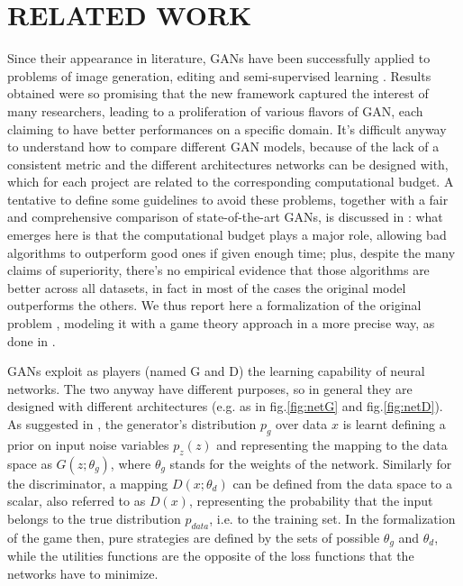 \section{RELATED WORK} \label{relatedwork}

Since their appearance in literature, GANs have been successfully applied to problems of image generation, editing and semi-supervised learning \cite{DBLP:journals/corr/RadfordMC15} \cite{DBLP:journals/corr/ZhangXLZHWM16}.
Results obtained were so promising that the new framework captured the interest of many researchers, leading to a proliferation of various flavors of GAN, each claiming to have better performances on a specific domain.
It's difficult anyway to understand how to compare different GAN models, because of the lack of a consistent metric and the different architectures networks can be designed with, which for each project are related to the corresponding computational budget.
A tentative to define some guidelines to avoid these problems, together with a fair and comprehensive comparison of state-of-the-art GANs, is discussed in \cite{46506}: what emerges here is that the computational budget plays a major role, allowing bad algorithms to outperform good ones if given enough time; plus, despite the many claims of superiority, there's no empirical evidence that those algorithms are better across all datasets, in fact in most of the cases the original model outperforms the others.
We thus report here a formalization of the original problem \cite{NIPS2014_5423}, modeling it with a game theory approach in a more precise way, as done in \cite{2017arXiv171200679O}.

GANs exploit as players (named G and D) the learning capability of neural networks. The two anyway have different purposes, so in general they are designed with different architectures (e.g. as in fig.\ref{fig:netG} and fig.\ref{fig:netD}).
As suggested in \cite{NIPS2014_5423}, the generator's distribution $p_g$ over data $x$ is learnt defining a prior on input noise variables $p_z(z)$ and representing the mapping to the data space as $G(z;\theta_g)$, where $\theta_g$ stands for the weights of the network.
Similarly for the discriminator, a mapping $D(x;\theta_d)$ can be defined from the data space to a scalar, also referred to as $D(x)$, representing the probability that the input belongs to the true distribution $p_{data}$, i.e. to the training set.
In the formalization of the game then, pure strategies are defined by the sets of possible $\theta_g$ and $\theta_d$, while the utilities functions are the opposite of the loss functions that the networks have to minimize.

